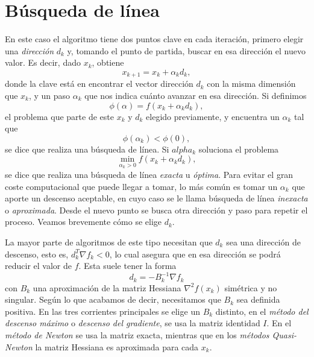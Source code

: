 \documentclass[11pt,a4paper]{book}
\theoremstyle{definition}
\theoremstyle{remark}
\begin{document}
\section{Búsqueda de línea}

En este caso el algoritmo tiene dos puntos clave en cada iteración, primero elegir
una \textit{dirección} $d_k$ y, tomando el punto de partida, buscar en esa dirección el
nuevo valor. Es decir, dado $x_k$, obtiene
\begin{equation} \label{eq:linesearch}
	x_{k+1} = x_k + \alpha_kd_k,
\end{equation}
donde la clave está en encontrar el vector dirección $d_k$
con la misma dimensión que $x_k$, y un paso $\alpha_k$ que nos indica
cuánto avanzar en esa dirección. Si definimos
\begin{equation}
	\phi(\alpha) = f(x_k+\alpha_kd_k),
\end{equation}
el problema que parte de este $x_k$ y $d_k$ elegido previamente, y encuentra un $\alpha_k$ tal que
\begin{equation}
	\phi(\alpha_k) < \phi(0),
\end{equation}
se dice que realiza una búsqueda de línea. Si $alpha_k$ soluciona el problema
\begin{equation} \label{min:alphak}
	\min_{\alpha_k>0}f\left(x_k+\alpha_kd_k\right),
\end{equation}
se dice que realiza una búsqueda de línea \textit{exacta} u \textit{óptima}. Para evitar el gran coste computacional que puede llegar a tomar, lo más común es tomar un $\alpha_k$ que aporte un descenso aceptable, en cuyo caso se le llama búsqueda de línea \textit{inexacta} o \textit{aproximada}. Desde el nuevo punto se busca otra dirección y paso para repetir el proceso.
Veamos brevemente cómo se elige $d_k$.

La mayor parte de algoritmos de este tipo necesitan que $d_k$ sea una dirección de descenso, esto es, $d_k^T \nabla f_k < 0$,
lo cual asegura que en esa dirección se podrá reducir el valor de $f$. Esta suele tener la forma
\begin{equation}
	d_k = -B_k^{-1} \nabla f_k
\end{equation}
con $B_k$ una aproximación de la matriz Hessiana $\nabla^2 f(x_k)$ simétrica y no singular. Según lo que acabamos de decir, necesitamos que $B_k$ sea definida positiva. En las tres corrientes principales se elige un $B_k$ distinto, en el \textit{método del descenso máximo} o \textit{descenso del gradiente}, se usa la matriz identidad $I$.
En el \textit{método de Newton} se usa la matriz exacta, mientras que en los \textit{métodos Quasi-Newton} la matriz Hessiana es aproximada para cada $x_k$.
\end{document}

